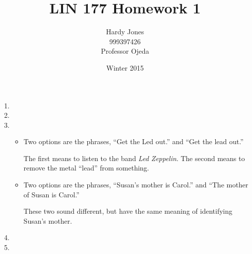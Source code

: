 \documentclass[12pt,letterpaper]{article}
\title{LIN 177 Homework 1\vspace{-2ex}}
\author{Hardy Jones\\
        999397426\\
        Professor Ojeda\vspace{-2ex}}
\date{Winter 2015}
\begin{document}
  \maketitle


  \begin{enumerate}
    \item

    \item

    \item
      \begin{itemize}
        \item
          Two options are the phrases, ``Get the Led out.'' and ``Get the lead out.''

          The first means to listen to the band \textit{Led Zeppelin}.
          The second means to remove the metal ``lead'' from something.

        \item
          Two options are the phrases, ``Susan's mother is Carol.'' and ``The mother of Susan is Carol.''

          These two sound different, but have the same meaning of identifying Susan's mother.
      \end{itemize}

    \pagebreak

    \item

    \item
  \end{enumerate}
\end{document}
